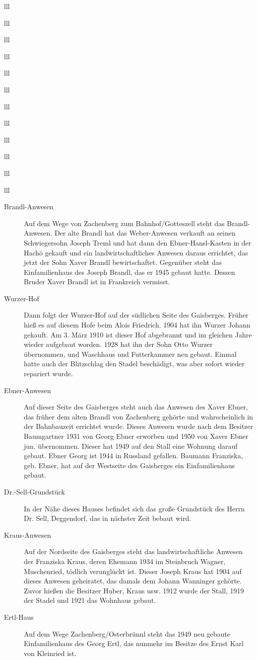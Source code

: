 \documentclass[12pt,a4pager]{book}
\begin{document}
\begin{tabuluar}{lll}
\begin{tabuluar}{lll}
\begin{tabuluar}{lll}
\begin{tabuluar}{lll}
\begin{tabuluar}{lll}
\begin{tabuluar}{lll}
\begin{tabuluar}{lll}
\begin{tabuluar}{lll}
\begin{tabuluar}{lll}
\begin{tabuluar}{lll}
\begin{tabuluar}{lll}
\begin{tabuluar}{lll}
\begin{description}
\item[Brandl-Anwesen] Auf dem Wege von Zachenberg zum Bahnhof/Gotteszell steht
das Brandl-Anwesen. Der alte Brandl hat das Weber-Anwesen verkauft an seinen
Schwiegersohn Joseph Treml und hat dann den Ebner-Hansl-Kasten in der Hachö
gekauft und ein landwirtschaftliches Anwesen daraus errichtet, das jetzt der
Sohn Xaver Brandl bewirtschaftet. Gegenüber steht das Einfamilienhaus des Joseph
Brandl, das er 1945 gebaut hatte. Dessen Bruder Xaver Brandl ist in Frankreich
vermisst.

\item[Wurzer-Hof] Dann folgt der Wurzer-Hof auf der südlichen Seite des
Gaisberges. Früher hieß es auf diesem Hofe beim Alois Friedrich. 1904 hat ihn
Wurzer Johann gekauft. Am 3. März 1910 ist dieser Hof abgebrannt und im gleichen
Jahre wieder aufgebaut worden. 1928 hat ihn der Sohn Otto Wurzer übernommen, und
Waschhaus und Futterkammer neu gebaut. Einmal hatte auch der Blitzschlag den
Stadel beschädigt, was aber sofort wieder repariert wurde.

\item[Ebner-Anwesen] Auf dieser Seite des Gaisberges steht auch das Anwesen des
Xaver Ebner, das früher dem alten Brandl von Zachenberg gehörte und
wahrscheinlich in der Bahnbauzeit errichtet wurde. Dieses Anwesen wurde nach dem
Besitzer Baumgartner 1931 von Georg Ebner erworben und 1950 von Xaver Ebner jun.
übernommen. Dieser hat 1949 auf den Stall eine Wohnung darauf gebaut. Ebner
Georg ist 1944 in Russland gefallen. Baumann Franziska, geb. Ebner, hat auf der
Westseite des Gaisberges ein Einfamilienhaus gebaut.

\item[Dr.-Sell-Grundstück] In der Nähe dieses Hauses befindet sich das große
Grundstück des Herrn Dr. Sell, Deggendorf, das in nächster Zeit bebaut wird.

\item[Kraus-Anwesen] Auf der Nordseite des Gaisberges steht das
landwirtschaftliche Anwesen der Franziska Kraus, deren Ehemann 1934 im
Steinbruch Wagner, Muschenried, tödlich verunglückt ist. Dieser Joseph Kraus hat
1904 auf dieses Anwesen geheiratet, das damals dem Johann Wanninger gehörte.
Zuvor hießen die Besitzer Huber, Kraus usw. 1912 wurde der Stall, 1919 der
Stadel und 1921 das Wohnhaus gebaut.

\item[Ertl-Haus] Auf dem Wege Zachenberg/Osterbrünnl steht das 1949 neu gebaute
Einfamilienhaus des Georg Ertl, das nunmehr im Besitze des Ernst Karl von
Kleinried ist.


\end{description}
\end{tabuluar}
\end{tabuluar}
\end{tabuluar}
\end{tabuluar}
\end{tabuluar}
\end{tabuluar}
\end{tabuluar}
\end{tabuluar}
\end{tabuluar}
\end{tabuluar}
\end{tabuluar}
\end{tabuluar}
\end{document}

